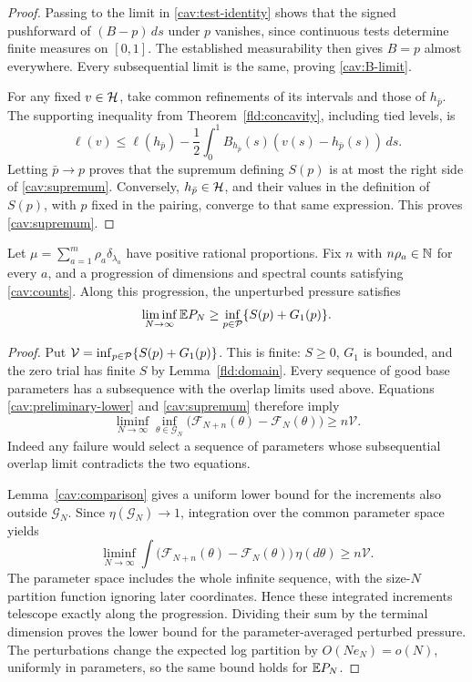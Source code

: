 \begin{proof}
Passing to the limit in \eqref{cav:test-identity} shows that the signed
pushforward of $(B-p)\,ds$ under $p$ vanishes, since continuous tests
determine finite measures on $[0,1]$.  The established measurability
then gives $B=p$ almost everywhere.  Every subsequential limit is the
same, proving \eqref{cav:B-limit}.

For any fixed $v\in\mathcal H$, take common refinements of its intervals and
those of $h_{\bar p}$.  The supporting inequality from
Theorem~\ref{fld:concavity}, including tied levels, is
\[
 \ell(v)\le\ell(h_{\bar p})
 -\frac12\int_0^1B_{h_{\bar p}}(s)
                    (v(s)-h_{\bar p}(s))\,ds.
\]
Letting $\bar p\to p$ proves that the supremum defining $S(p)$ is at
most the right side of \eqref{cav:supremum}.  Conversely,
$h_{\bar p}\in\mathcal H$, and their values in the definition of $S(p)$,
with $p$ fixed in the pairing, converge to that same expression.
This proves \eqref{cav:supremum}.
\end{proof}

\begin{proposition}\label{cav:lower}
Let $\mu=\sum_{a=1}^m\rho_a\delta_{\lambda_a}$ have positive rational
proportions.  Fix $n$ with $n\rho_a\in\mathbb N$ for every $a$, and a
progression of dimensions and spectral counts satisfying
\eqref{cav:counts}.  Along this progression, the unperturbed pressure
satisfies
\[
 \liminf_{N\to\infty}\mathbb E P_N
 \ge\inf_{p\in\mathcal P}\{S(p)+G_1(p)\}.
\]
\end{proposition}

\begin{proof}
Put $\mathcal V=\inf_{p\in\mathcal P}\{S(p)+G_1(p)\}$.  This is finite:
$S\ge0$, $G_1$ is bounded, and the zero trial has finite $S$ by
Lemma~\ref{fld:domain}.  Every sequence of good base parameters has
a subsequence with the overlap limits used above.  Equations
\eqref{cav:preliminary-lower} and \eqref{cav:supremum} therefore imply
\[
 \liminf_{N\to\infty}\inf_{\theta\in\mathcal G_N}
 \big(\mathcal F_{N+n}(\theta)-\mathcal F_N(\theta)\big)
 \ge n\mathcal V.
\]
Indeed any failure would select a sequence of parameters whose
subsequential overlap limit contradicts the two equations.

Lemma~\ref{cav:comparison} gives a uniform lower bound for the
increments also outside $\mathcal G_N$.  Since
$\eta(\mathcal G_N)\to1$, integration over the common parameter
space yields
\[
 \liminf_{N\to\infty}\int
 \big(\mathcal F_{N+n}(\theta)-\mathcal F_N(\theta)\big)\,\eta(d\theta)
 \ge n\mathcal V.
\]
The parameter space includes the whole infinite sequence, with the
size-$N$ partition function ignoring later coordinates.  Hence these
integrated increments telescope exactly along the progression.
Dividing their sum by the terminal dimension proves the lower bound
for the parameter-averaged perturbed pressure.  The perturbations
change the expected log partition by $O(Ne_N)=o(N)$, uniformly in
parameters, so the same bound holds for $\mathbb E P_N$.
\end{proof}

